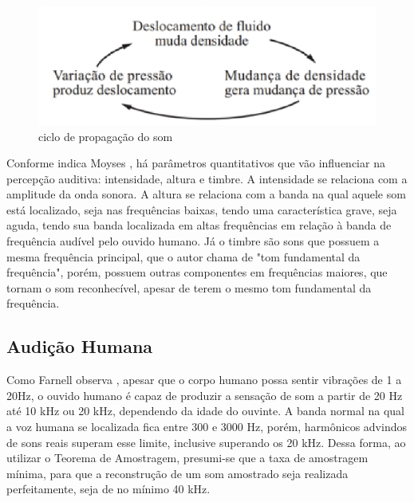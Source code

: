 \begin{figure}[h]
	\centering
    \includegraphics[scale=0.7]{figuras/fig07.eps}
	\caption{ciclo de propagação do som}
	\label{fig07}
\end{figure}

Conforme indica Moyses \cite{moyses}, há parâmetros quantitativos que vão influenciar na percepção auditiva: intensidade, altura e timbre. A intensidade se relaciona com a amplitude da onda sonora. A altura se relaciona com a banda na qual aquele som está localizado, seja nas frequências baixas, tendo uma característica grave, seja aguda, tendo sua banda localizada em altas frequências em relação à banda de frequência audível pelo ouvido humano. Já o timbre são sons que possuem a mesma frequência principal, que o autor chama de "tom fundamental da frequência", porém, possuem outras componentes em frequências maiores, que tornam o som reconhecível, apesar de terem o mesmo tom fundamental da frequência.

\subsection{Audição Humana}
Como Farnell observa \cite{farnell}, apesar que o corpo humano possa sentir vibrações de 1 a 20Hz, o ouvido humano é capaz de produzir a sensação de som a partir de 20 Hz até 10 kHz ou 20 kHz, dependendo da idade do ouvinte. A banda normal na qual a voz humana se localizada fica entre 300 e 3000 Hz, porém, harmônicos advindos de sons reais superam esse limite, inclusive superando os 20 kHz.
Dessa forma, ao utilizar o Teorema de Amostragem, presumi-se que a taxa de amostragem mínima, para que a reconstrução de um som amostrado seja realizada perfeitamente, seja de no mínimo 40 kHz. 


